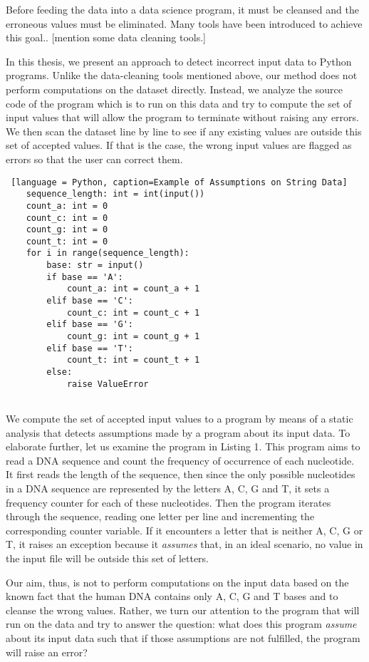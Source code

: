 \documentclass[]{report}
\begin{document}
Before feeding the data into a data science program, it must be cleansed and the erroneous values must be eliminated. Many tools have been introduced to achieve this goal.. [mention some data cleaning tools.] 

In this thesis, we present an approach to detect incorrect input data to Python programs. Unlike the data-cleaning tools mentioned above, our method does not perform computations on the dataset directly. Instead, we analyze the source code of the program which is to run on this data and try to compute the set of input values that will allow the program to terminate without raising any errors.  We then scan the dataset line by line to see if any existing values are outside this set of accepted values. If that is the case, the wrong input values are flagged as errors so that the user can correct them.  

\begin{lstlisting} [language = Python, caption=Example of Assumptions on String Data] 
	sequence_length: int = int(input())
	count_a: int = 0
	count_c: int = 0
	count_g: int = 0
	count_t: int = 0
	for i in range(sequence_length):
		base: str = input()
		if base == 'A':
			count_a: int = count_a + 1
		elif base == 'C':
			count_c: int = count_c + 1
		elif base == 'G':
			count_g: int = count_g + 1
		elif base == 'T':
			count_t: int = count_t + 1
		else:
			raise ValueError
			
\end{lstlisting} 

We compute the set of accepted input values to a program by means of a static analysis that detects assumptions made by a program about its input data. To elaborate further, let us examine the program in Listing 1. This program aims to read a DNA sequence and count the frequency of occurrence of each nucleotide. It first reads the length of the sequence, then since the only possible nucleotides in a DNA sequence are represented by the letters A, C, G and T, it sets a frequency counter for each of these nucleotides. Then the program iterates through the sequence, reading one letter per line and incrementing the corresponding counter variable. If it encounters a letter that is neither A, C, G or T, it raises an exception because it \textit{assumes} that, in an ideal scenario, no value in the input file will be outside this set of letters. 

Our aim, thus, is not to perform computations on the input data based on the known fact that the human DNA contains only A, C, G and T bases and to cleanse the wrong values. Rather, we turn our attention to the program that will run on the data and try to answer the question: what does this program \textit{assume} about its input data such that if those assumptions are not fulfilled, the program will raise an error?
\end{document}
